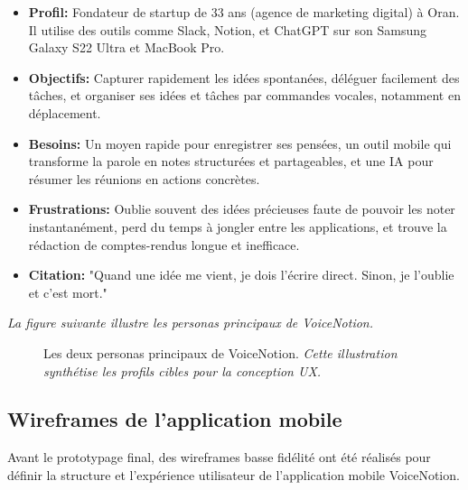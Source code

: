    \begin{itemize}
        \item \textbf{Profil:} Fondateur de startup de 33 ans (agence de marketing digital) à Oran. Il utilise des outils comme Slack, Notion, et ChatGPT sur son Samsung Galaxy S22 Ultra et MacBook Pro.
        \item \textbf{Objectifs:} Capturer rapidement les idées spontanées, déléguer facilement des tâches, et organiser ses idées et tâches par commandes vocales, notamment en déplacement.
        \item \textbf{Besoins:} Un moyen rapide pour enregistrer ses pensées, un outil mobile qui transforme la parole en notes structurées et partageables, et une IA pour résumer les réunions en actions concrètes.
        \item \textbf{Frustrations:} Oublie souvent des idées précieuses faute de pouvoir les noter instantanément, perd du temps à jongler entre les applications, et trouve la rédaction de comptes-rendus longue et inefficace.
        \item \textbf{Citation:} "Quand une idée me vient, je dois l’écrire direct. Sinon, je l’oublie et c’est mort."
    \end{itemize}
    
        \textit{La figure suivante illustre les personas principaux de VoiceNotion.}
    \begin{figure}[htbp]
        \centering
        \caption{Les deux personas principaux de VoiceNotion. \newline\textit{Cette illustration synthétise les profils cibles pour la conception UX.}}
        \label{fig:voicenotion_personas}
    \end{figure}
    
    
    \subsection{Wireframes de l'application mobile}
    
    Avant le prototypage final, des wireframes basse fidélité ont été réalisés pour définir la structure et l'expérience utilisateur de l'application mobile VoiceNotion.
    
